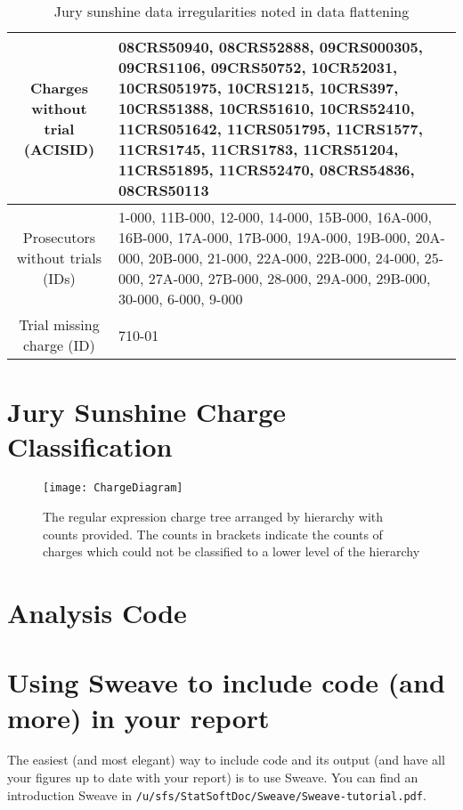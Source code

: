 \begin{table}[h]
  \caption[Jury Sunshine Irregularities]{Jury sunshine data irregularities noted in data flattening}
  \centering
  \begin{tabularx}{\textwidth}{|c|X|} \hline
    Charges without trial (ACISID) & 08CRS50940, 08CRS52888, 09CRS000305, 09CRS1106, 09CRS50752, 10CR52031, 10CRS051975,
    10CRS1215, 10CRS397, 10CRS51388, 10CRS51610, 10CRS52410, 11CRS051642, 11CRS051795, 11CRS1577, 11CRS1745, 11CRS1783,
    11CRS51204, 11CRS51895, 11CRS52470, 08CRS54836, 08CRS50113 \\ \hline 
    Prosecutors without trials (IDs) & 1-000, 11B-000, 12-000, 14-000, 15B-000, 16A-000,
                     16B-000, 17A-000, 17B-000, 19A-000, 19B-000,
                     20A-000, 20B-000, 21-000, 22A-000, 22B-000,
                     24-000, 25-000, 27A-000, 27B-000, 28-000,
                                       29A-000, 29B-000, 30-000, 6-000, 9-000 \\ \hline
    Trial missing charge (ID) & 710-01 \\ \hline
  \end{tabularx}
\end{table}

\section{Jury Sunshine Charge Classification} \label{app:charge}

\begin{figure}[!h]
  \centering
  \texttt{[image: ChargeDiagram]}
  \caption[Regular expression charge tree visualized]{The regular expression charge tree arranged by hierarchy with counts
    provided. The counts in brackets indicate the counts of charges which could not be classified to a lower level of the
    hierarchy}
  \label{fig:chargetree}
\end{figure}

\section{Analysis Code} \label{app:analysis}



\section{Using Sweave to include \Rp code (and more) in your report}
The easiest (and most elegant) way to include \Rp code and its output (and
have all your figures up to date with your report) is to use Sweave. You
can find an introduction Sweave in \texttt{/u/sfs/StatSoftDoc/Sweave/Sweave-tutorial.pdf}.

